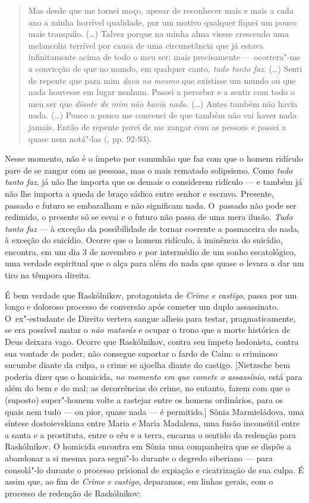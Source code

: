 \begin{quote}
Mas desde que me tornei moço, apesar de reconhecer mais e mais a cada
ano a minha horrível qualidade, por um motivo qualquer fiquei um pouco
mais tranquilo. (\ldots) Talvez porque na minha alma viesse crescendo uma
melancolia terrível por causa de uma circunstância que já estava
infinitamente acima de todo o meu ser: mais precisamente --- ocorrera"-me
a convicção de que no mundo, em qualquer canto, \emph{tudo tanto faz.}
(\ldots) Senti de repente que para mim \emph{dava no mesmo} que existisse
um mundo ou que nada houvesse em lugar nenhum. Passei a perceber e a
sentir com todo o meu ser que \emph{diante de mim não havia nada.} (\ldots)
Antes também não havia nada. (\ldots) Pouco a pouco me convenci de que
também não vai haver nada jamais. Então de repente parei de me zangar
com as pessoas e passei a quase nem notá"-las (, pp. 92-93).
\end{quote}

Nesse momento, não é o ímpeto por comunhão que faz com que o homem
ridículo pare de se zangar com as pessoas, mas o mais rematado
solipsismo. Como \emph{tudo tanto faz}, já não lhe importa que os demais
o considerem ridículo --- e também já não lhe importa a queda de braço
sádica entre senhor e escravo. Presente, passado e futuro se embaralham
e não significam nada. O~passado não pode ser redimido, o presente só se
esvai e o futuro não passa de uma mera ilusão. \emph{Tudo tanto faz} ---
à exceção da possibilidade de tornar coerente a pasmaceira do nada, à
exceção do suicídio. Ocorre que o homem ridículo, à iminência do
suicídio, encontra, em um dia 3 de novembro e por intermédio de um sonho
escatológico, uma verdade espiritual que o alça para além do nada que
quase o levara a dar um tiro na têmpora direita.

É bem verdade que Raskólnikov, protagonista de \emph{Crime e castigo},
passa por um longo e doloroso processo de conversão após cometer um
duplo assassinato. O~ex"-estudante de Direito vertera sangue alheio para
testar, pragmaticamente, se era possível matar o \emph{não matarás} e
ocupar o trono que a morte histórica de Deus deixara vago. Ocorre que
Raskólnikov, contra seu ímpeto hedonista, contra sua vontade de poder,
não consegue suportar o fardo de Caim: o criminoso sucumbe diante da
culpa, o crime se ajoelha diante do castigo. {[}Nietzsche bem poderia
dizer que o homicida, \emph{no momento em que comete o assassínio}, está
para além do bem e do mal; as decorrências do crime, no entanto, fazem
com que o (suposto) super"-homem volte a rastejar entre os homens
ordinários, para os quais nem tudo --- ou pior, quase nada --- é
permitido.{]} Sônia Marmieládova, uma síntese dostoievskiana entre Maria
e Maria Madalena, uma fusão inconsútil entre a santa e a prostituta,
entre o céu e a terra, encarna o sentido da redenção para Raskólnikov. O
homicida encontra em Sônia uma companheira que se dispõe a abandonar a
si mesma para segui"-lo durante o degredo siberiano --- para consolá"-lo
durante o processo prisional de expiação e cicatrização de sua culpa. É
assim que, ao fim de \emph{Crime e castigo}, deparamos, em linhas
gerais, com o processo de redenção de Raskólnikov:

